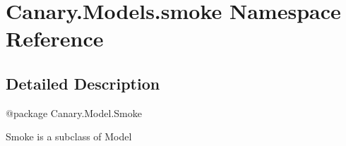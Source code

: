 \hypertarget{namespace_canary_1_1_models_1_1smoke}{\section{Canary.\-Models.\-smoke Namespace Reference}
\label{namespace_canary_1_1_models_1_1smoke}
}


\subsection{Detailed Description}
\begin{DoxyVerb}@package Canary.Model.Smoke

Smoke is a subclass of Model
\end{DoxyVerb}
 